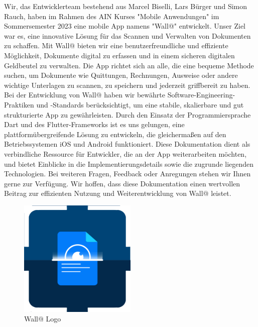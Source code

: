 Wir, das Entwicklerteam bestehend aus Marcel Biselli, Lars Bürger und Simon Rauch, haben im Rahmen des AIN Kurses "Mobile Anwendungen" 
im Sommersemester 2023 eine mobile App namens "Wall@" entwickelt. 
Unser Ziel war es, eine innovative Lösung für das Scannen und Verwalten von Dokumenten zu schaffen.
\newline
\newline
Mit Wall@ bieten wir eine benutzerfreundliche und effiziente Möglichkeit, Dokumente digital zu erfassen und in einem sicheren digitalen Geldbeutel zu verwalten. 
Die App richtet sich an alle, die eine bequeme Methode suchen, um Dokumente wie Quittungen, Rechnungen, Ausweise oder andere wichtige Unterlagen zu scannen, 
zu speichern und jederzeit griffbereit zu haben.
\newline
\newline
Bei der Entwicklung von Wall@ haben wir bewährte Software-Engineering-Praktiken und -Standards berücksichtigt, 
um eine stabile, skalierbare und gut strukturierte App zu gewährleisten. 
Durch den Einsatz der Programmiersprache Dart und des Flutter-Frameworks ist es uns gelungen, eine plattformübergreifende Lösung zu entwickeln, 
die gleichermaßen auf den Betriebssystemen iOS und Android funktioniert.
\newline
\newline
Diese Dokumentation dient als verbindliche Ressource für Entwickler, die an der App weiterarbeiten möchten, 
und bietet Einblicke in die Implementierungsdetails sowie die zugrunde liegenden Technologien.
\newline
\newline
Bei weiteren Fragen, Feedback oder Anregungen stehen wir Ihnen gerne zur Verfügung. 
Wir hoffen, dass diese Dokumentation einen wertvollen Beitrag zur effizienten Nutzung und Weiterentwicklung von Wall@ leistet.
\newline
\newline

\begin{figure}[h!]
  \centering
  \includegraphics[width=0.5\textwidth]{figures/logo.png}
  \caption{Wall@ Logo}
  \label{fig:logo}
\end{figure}